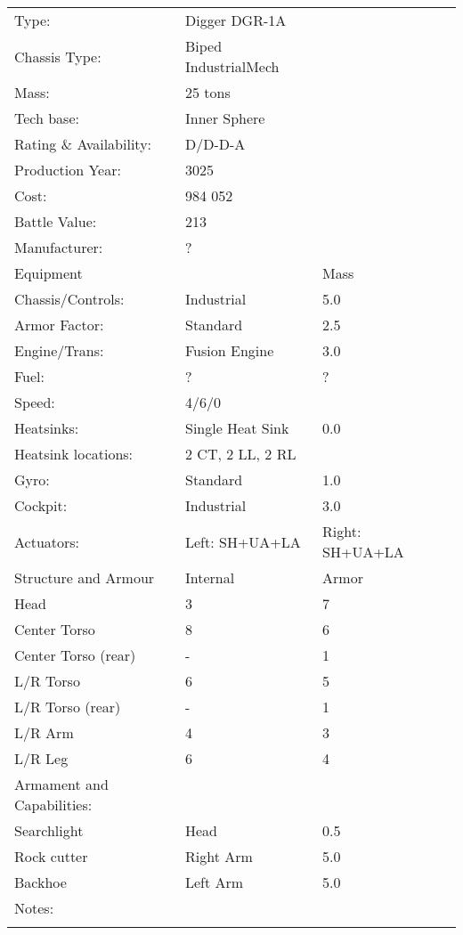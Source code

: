 \documentclass{tufte-book}
\begin{document}
\bigskip
\begin{minipage}{\textwidth}
\begin{center}
\begin{tabular}{llll}
\toprule
Type: & Digger DGR-1A & \\
Chassis Type: & Biped IndustrialMech & \\
Mass: & 25 tons & \\
Tech base: & Inner Sphere & \\
Rating \& Availability: & D/D-D-A & \\
Production Year: & 3025 & \\
Cost: & 984 052 & \\
Battle Value: & 213 & \\
Manufacturer: & ? & \\
Equipment & & Mass \\
\quad Chassis/Controls: & Industrial & 5.0 \\
\quad Armor Factor: & Standard & 2.5 \\
\quad Engine/Trans: & Fusion Engine & 3.0 \\
\quad Fuel: & ? & ? \\
\quad Speed: & \multicolumn{2}{l}{4/6/0} \\
\quad Heatsinks: & Single Heat Sink & 0.0 \\
\quad Heatsink locations: & 2 CT, 2 LL, 2 RL & \\
\quad Gyro: & Standard & 1.0 \\
\quad Cockpit: & Industrial & 3.0 \\
\quad Actuators: & Left: SH+UA+LA & Right: SH+UA+LA \\
Structure and Armour & Internal & Armor \\
\quad Head & 3 & 7 \\
\quad Center Torso & 8 & 6 \\
\quad Center Torso (rear) & - & 1 \\
\quad L/R Torso & 6 & 5 \\
\quad L/R Torso (rear) & - & 1 \\
\quad L/R Arm & 4 & 3 \\
\quad L/R Leg & 6 & 4 \\

Armament and Capabilities: & & \\
\quad Searchlight & Head & 0.5 \\
\quad Rock cutter & Right Arm & 5.0 \\
\quad Backhoe & Left Arm & 5.0 \\

Notes: & & \\
\multicolumn{3}{l}{\quad } \\

\bottomrule
\end{tabular}
\end{center}
\end{minipage}
\end{document}
